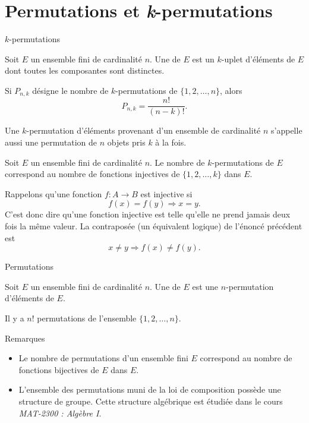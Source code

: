 \documentclass[nuit,charter,pied]{BeamerJS}
\begin{document}
\section{Permutations et \textit{k}-permutations}
\begin{frame}{$k$-permutations}
\pause
\begin{defn}{}
Soit $E$ un ensemble fini de cardinalité $n$. Une  de $E$ est un $k$-uplet d'éléments de $E$ dont toutes les composantes sont distinctes.
\end{defn}
\pause
\begin{prop}
Si $P_{n,k}$ désigne le nombre de $k$-permutations de $\{1,2,\ldots,n\}$, alors
\[P_{n,k}=\frac{n!}{(n-k)!}.\]
\end{prop}
\pause
\begin{lumiere}
Une $k$-permutation d'éléments provenant d'un ensemble de cardinalité $n$ s'appelle aussi une permutation de $n$ objets pris $k$ à la fois.
\end{lumiere}
\end{frame}
\begin{frame}
\begin{prop}
Soit $E$ un ensemble fini de cardinalité $n$. Le nombre de $k$-permutations de $E$ correspond au nombre de fonctions injectives de $\{1,2,\ldots,k\}$ dans $E$.
\end{prop}
\pause
\begin{lumiere}
 Rappelons qu'une fonction \(f:A\rightarrow B\) est injective si \[f(x)=f(y)\Rightarrow x=y.\] C'est donc dire qu'une fonction injective est telle qu'elle ne prend jamais deux fois la même valeur. La contraposée (un équivalent logique) de l'énoncé précédent est
 \[x\neq y\Rightarrow f(x)\neq f(y).\]
\end{lumiere}
\end{frame}

\begin{frame}[t]{Permutations}
\begin{defn}
Soit $E$ un ensemble fini de cardinalité $n$. Une  de $E$ est une $n$-permutation d'éléments de $E$.
\end{defn}
\pause
\begin{prop}
Il y a $n!$ permutations de l'ensemble \(\{1,2,\ldots,n\}\).
\end{prop}
\end{frame}
\begin{frame}{Remarques}
\begin{rems}
\begin{itemize}
\item Le nombre de permutations d'un ensemble fini $E$ correspond au nombre de fonctions bijectives de $E$ dans $E$.
\item L'ensemble des permutations muni de la loi de composition possède une structure de groupe. Cette structure algébrique est étudiée dans le cours \emph{MAT-2300 : Algèbre I}.
\end{itemize}
\end{rems}
\end{frame}
\end{document}
